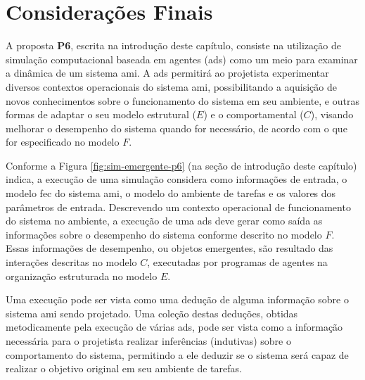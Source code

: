 \section{Considerações Finais}

    A proposta \textbf{P6}, escrita na introdução deste capítulo, consiste na utilização de simulação computacional baseada em agentes (\acrshort{ads}) como um meio para examinar a dinâmica de um sistema \acrshort{ami}. A \acrshort{ads} permitirá ao projetista experimentar diversos contextos operacionais do sistema \acrshort{ami}, possibilitando a aquisição de novos conhecimentos sobre o funcionamento do sistema em seu ambiente, e outras formas de adaptar o seu modelo estrutural ($E$) e o comportamental ($C$),  visando melhorar o desempenho do sistema quando for necessário, de acordo com o que for especificado no modelo $F$.
    
    Conforme a Figura \ref{fig:sim-emergente-p6} (na seção de introdução deste capítulo) indica, a execução de uma simulação considera como informações de entrada, o modelo \acrshort{fec} do sistema \acrshort{ami}, o modelo do ambiente de tarefas e os valores dos parâmetros de entrada. Descrevendo um contexto operacional de funcionamento do sistema no ambiente, a execução de uma \acrshort{ads} deve gerar como saída as informações sobre o desempenho do sistema conforme descrito no modelo $F$. Essas informações de desempenho, ou objetos emergentes, são resultado das interações descritas no modelo $C$, executadas por programas de agentes na organização estruturada no modelo $E$. 
    
    Uma execução pode ser vista como uma dedução de alguma informação sobre o sistema \acrshort{ami} sendo projetado. Uma coleção destas deduções, obtidas metodicamente pela execução de várias \acrshort{ads}, pode ser vista como a informação necessária para o projetista realizar inferências (indutivas) sobre o comportamento do sistema, permitindo a ele deduzir se o sistema será capaz de realizar o objetivo original em seu ambiente de tarefas.
    